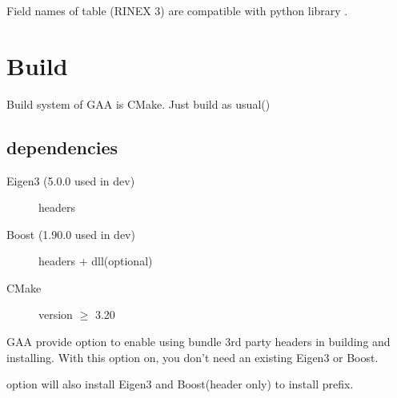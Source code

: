 \documentclass[9pt,a4paper,onecolumn,oneside]{rho-class/rho}
\begin{document}
\begin{note}
    Field names of table (RINEX 3) are compatible with python library .
\end{note}

\section{Build}
Build system of GAA is CMake. Just build as usual()

\subsection{dependencies}
\begin{description}
    \item[Eigen3 (5.0.0 used in dev)] headers
    \item[Boost (1.90.0 used in dev)] headers + dll(optional)
    \item[CMake] version \(\geq \) 3.20
\end{description}

GAA provide option  to enable using bundle 3rd party headers in building and installing. With this option on, you don't need an existing Eigen3 or Boost.

\begin{info}
    option  will also install Eigen3 and Boost(header only) to install prefix.
\end{info}

\printbibliography

\end{document}
